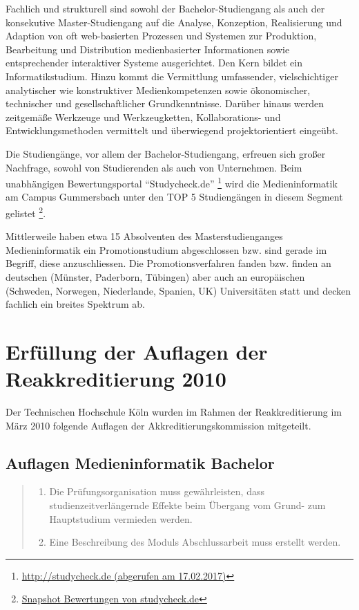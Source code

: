 Fachlich und strukturell sind sowohl der Bachelor-Studiengang als auch
der konsekutive Master-Studiengang auf die Analyse, Konzeption,
Realisierung und Adaption von oft web-basierten Prozessen und Systemen
zur Produktion, Bearbeitung und Distribution medienbasierter
Informationen sowie entsprechender interaktiver Systeme ausgerichtet.
Den Kern bildet ein Informatikstudium. Hinzu kommt die Vermittlung
umfassender, vielschichtiger analytischer wie konstruktiver
Medienkompetenzen sowie ökonomischer, technischer und gesellschaftlicher
Grundkenntnisse. Darüber hinaus werden zeitgemäße Werkzeuge und
Werkzeugketten, Kollaborations- und Entwicklungsmethoden vermittelt und
überwiegend projektorientiert eingeübt.

Die Studiengänge, vor allem der Bachelor-Studiengang, erfreuen sich
großer Nachfrage, sowohl von Studierenden als auch von Unternehmen. Beim
unabhängigen Bewertungsportal ``Studycheck.de'' \footnote{\href{http://studycheck.de}{http://studycheck.de
  (abgerufen am 17.02.2017)}} wird die Medieninformatik am Campus
Gummersbach unter den TOP 5 Studiengängen in diesem Segment gelistet
\footnote{\href{../anhaenge/snapshot_2017_02_17_bewertungen_studiengang_medieninformatik_auf_studycheck_._de}{Snapshot
  Bewertungen von studycheck.de}}.

Mittlerweile haben etwa 15 Absolventen des Masterstudienganges
Medieninformatik ein Promotionstudium abgeschlossen bzw. sind gerade im
Begriff, diese anzuschliessen. Die Promotionsverfahren fanden bzw.
finden an deutschen (Münster, Paderborn, Tübingen) aber auch an
europäischen (Schweden, Norwegen, Niederlande, Spanien, UK)
Universitäten statt und decken fachlich ein breites Spektrum ab.

\section{Erfüllung der Auflagen der Reakkreditierung
2010}\label{erfuxfcllung-der-auflagen-der-reakkreditierung-2010}

Der Technischen Hochschule Köln wurden im Rahmen der Reakkreditierung im
März 2010 folgende Auflagen der Akkreditierungskommission mitgeteilt.

\subsection{Auflagen Medieninformatik
Bachelor}\label{auflagen-medieninformatik-bachelor}

\begin{quote}
\begin{enumerate}
\def\labelenumi{\arabic{enumi}.}
\tightlist
\item
  Die Prüfungsorganisation muss gewährleisten, dass
  studienzeitverlängernde Effekte beim Übergang vom Grund- zum
  Hauptstudium vermieden werden.
\item
  Eine Beschreibung des Moduls Abschlussarbeit muss erstellt werden.
\end{enumerate}
\end{quote}

